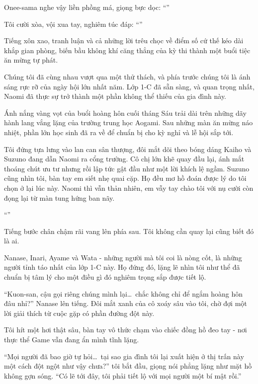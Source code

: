 \documentclass[../main.tex]{subfiles}
\begin{document}
Onee-sama nghe vậy liền phồng má, giọng bực dọc: ``''

Tôi cười xòa, vội xua tay, nghiêm túc đáp: ``''

Tiếng xôn xao, tranh luận và cả những lời trêu chọc về điểm số cứ thế kéo dài khắp gian phòng, biến bầu không khí căng thẳng của kỳ thi thành một buổi tiệc ăn mừng tự phát.

Chúng tôi đã cùng nhau vượt qua một thử thách, và phía trước chúng tôi là ánh sáng rực rỡ của ngày hội lớn nhất năm. Lớp 1-C đã sẵn sàng, và quan trọng nhất, Naomi đã thực sự trở thành một phần không thể thiếu của gia đình này.


Ánh nắng vàng vọt của buổi hoàng hôn cuối tháng Sáu trải dài trên những dãy hành lang vắng lặng của trường trung học Aogami. Sau những màn ăn mừng náo nhiệt, phần lớn học sinh đã ra về để chuẩn bị cho kỳ nghỉ và lễ hội sắp tới.

Tôi đứng tựa lưng vào lan can sân thượng, đôi mắt dõi theo bóng dáng Kaiho và Suzuno đang dẫn Naomi ra cổng trường. Cô chị lớn khẽ quay đầu lại, ánh mắt thoáng chút ưu tư nhưng rồi lập tức gật đầu như một lời khích lệ ngầm. Suzuno cũng nhìn tôi, bàn tay em siết nhẹ quai cặp. Họ đều mơ hồ đoán được lý do tôi chọn ở lại lúc này. Naomi thì vẫn thản nhiên, em vẫy tay chào tôi với nụ cười còn đọng lại từ màn tung hứng ban nãy.

``''

Tiếng bước chân chậm rãi vang lên phía sau. Tôi không cần quay lại cũng biết đó là ai.

Nanase, Inari, Ayame và Wata - những người mà tôi coi là nòng cốt, là những người tỉnh táo nhất của lớp 1-C này. Họ đứng đó, lặng lẽ nhìn tôi như thể đã chuẩn bị tâm lý cho một điều gì đó nghiêm trọng sắp được tiết lộ.

``Kuon-san, cậu gọi riêng chúng mình lại\dots\ chắc không chỉ để ngắm hoàng hôn đâu nhỉ?'' Nanase lên tiếng. Đôi mắt xanh của cô xoáy sâu vào tôi, chờ đợi một lời giải thích từ cuộc gặp có phần đường đột này.

Tôi hít một hơi thật sâu, bàn tay vô thức chạm vào chiếc đồng hồ đeo tay - nơi thực thể Game vẫn đang ẩn mình tĩnh lặng.

``Mọi người đã bao giờ tự hỏi\dots\ tại sao gia đình tôi lại xuất hiện ở thị trấn này một cách đột ngột như vậy chưa?'' tôi bắt đầu, giọng nói phẳng lặng như mặt hồ không gợn sóng. ``Có lẽ tới đây, tôi phải tiết lộ với mọi người một bí mật rồi.''
\end{document}
